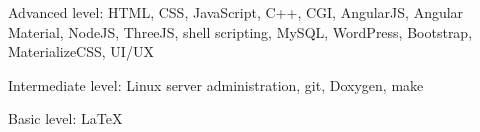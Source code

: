 \cventry{}
    {Advanced level:}
    {}
    {HTML, CSS, JavaScript, C++, CGI, AngularJS, Angular Material, NodeJS, ThreeJS, shell scripting, MySQL, WordPress, Bootstrap, MaterializeCSS, UI/UX}
    {}
    {}

\cventry{}
    {Intermediate level:}
    {}
    {Linux server administration, git, Doxygen, make}
    {}
    {}

\cventry{}
    {Basic level:}
    {}
    {\LaTeX}
    {}
    {}
